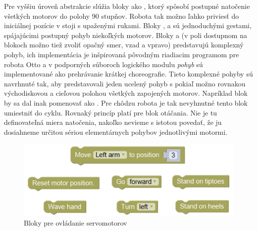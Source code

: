 Pre vyššiu úroveň abstrakcie slúžia bloky ako , ktorý spôsobí postupné natočenie všetkých motorov do polohy 90 stupňov. Robota tak možno ľahko priviesť do iniciálnej pozície v stoji s upaženými rukami. Bloky ,  a  sú jednoduchými gestami, spájajúcimi postupný pohyb niekoľkých motorov. Bloky  a  (v poli dostupnom na blokoch možno tiež zvoliť opačný smer, vzad a vpravo) predstavujú komplexný pohyb, ich implementácia je inšpirovaná pôvodným riadiacim programom pre robota Otto a v podporných súboroch logického modulu \textit{pohyb} sú implementované ako prehrávanie krátkej choreografie. Tieto komplexné pohyby sú navrhnuté tak, aby predstavovali jeden ucelený pohyb s pokiaľ možno rovnakou východiskovou a cieľovou polohou všetkých zapojených motorov. Napríklad blok  by sa dal inak pomenovať ako . Pre chôdzu robota je tak nevyhnutné tento blok umiestniť do cyklu. Rovnaký princíp platí pre blok otáčania. Nie je tu definovateľná miera natočenia, nakoľko nevieme s istotou povedať, že ju dosiahneme určitou sériou elementárnych pohybov jednotlivými motormi.

\begin{figure}[bh!]
\centerline{\includegraphics[]{images/move-blocks}}
\caption[Bloky pre ovládanie servomotorov]{Bloky pre ovládanie servomotorov}
\label{obr:move-blocks}
\end{figure}

\newpage

